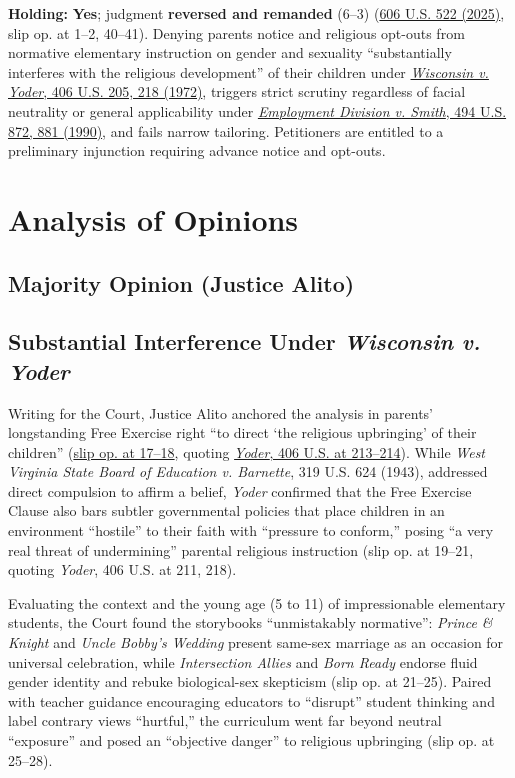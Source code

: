 \documentclass[12pt]{article}
\begin{document}
\textbf{Holding:} \textbf{Yes}; judgment \textbf{reversed and remanded} (6--3) (\href{https://www.law.cornell.edu/supremecourt/text/24-297}{606 U.S. 522 (2025)}, slip op. at 1--2, 40--41). Denying parents notice and religious opt-outs from normative elementary instruction on gender and sexuality ``substantially interferes with the religious development'' of their children under \href{https://supreme.justia.com/cases/federal/us/406/205/}{\textit{Wisconsin v. Yoder}, 406 U.S. 205, 218 (1972)}, triggers strict scrutiny regardless of facial neutrality or general applicability under \href{https://supreme.justia.com/cases/federal/us/494/872/}{\textit{Employment Division v. Smith}, 494 U.S. 872, 881 (1990)}, and fails narrow tailoring. Petitioners are entitled to a preliminary injunction requiring advance notice and opt-outs.

\section{Analysis of Opinions}
\subsection{Majority Opinion (Justice Alito)}

\subsection{Substantial Interference Under \textit{Wisconsin v. Yoder}}
Writing for the Court, Justice Alito anchored the analysis in parents' longstanding Free Exercise right ``to direct `the religious upbringing' of their children'' (\href{https://www.law.cornell.edu/supremecourt/text/24-297}{slip op. at 17--18}, quoting \href{https://supreme.justia.com/cases/federal/us/406/205/}{\textit{Yoder}, 406 U.S. at 213--214}). While \textit{West Virginia State Board of Education v. Barnette}, 319 U.S. 624 (1943), addressed direct compulsion to affirm a belief, \textit{Yoder} confirmed that the Free Exercise Clause also bars subtler governmental policies that place children in an environment ``hostile'' to their faith with ``pressure to conform,'' posing ``a very real threat of undermining'' parental religious instruction (slip op. at 19--21, quoting \textit{Yoder}, 406 U.S. at 211, 218).

Evaluating the context and the young age (5 to 11) of impressionable elementary students, the Court found the storybooks ``unmistakably normative'': \textit{Prince \& Knight} and \textit{Uncle Bobby's Wedding} present same-sex marriage as an occasion for universal celebration, while \textit{Intersection Allies} and \textit{Born Ready} endorse fluid gender identity and rebuke biological-sex skepticism (slip op. at 21--25). Paired with teacher guidance encouraging educators to ``disrupt'' student thinking and label contrary views ``hurtful,'' the curriculum went far beyond neutral ``exposure'' and posed an ``objective danger'' to religious upbringing (slip op. at 25--28).
\end{document}

